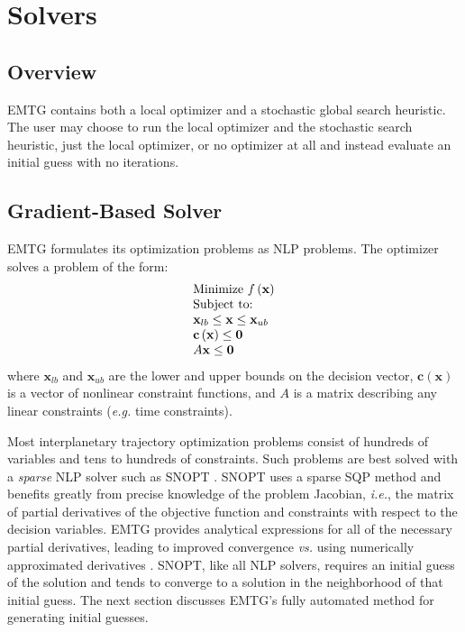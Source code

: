 \chapter{Solvers}
\label{chap:solvers}

\section{Overview}
\label{sec:solver-overview}

\ac{EMTG} contains both a local optimizer and a stochastic global search heuristic. The user may choose to run the local optimizer and the stochastic search heuristic, just the local optimizer, or no optimizer at all and instead evaluate an initial guess with no iterations.

\section{Gradient-Based Solver}
\label{sec:gradient-based-solver}

\ac{EMTG} formulates its optimization problems as \ac{NLP} problems. The optimizer solves a problem of the form:
%
\begin{equation}
\begin{array}{l}
{\text{Minimize }}f\left( {\bf{x}} \right) \\ 
{\text{Subject to:}} \\ 
{{\bf{x}}_{lb}} \le {\bf{x}} \le {{\bf{x}}_{ub}} \\ 
{\bf{c}}\left( {\bf{x}} \right) \le {\bf{0}} \\ 
A{\bf{x}} \le \bf{0} \\ 
\end{array}	
\label{eq:NLP}
\end{equation}
%
where $\mathbf{x}_{lb}$ and $\mathbf{x}_{ub}$ are the lower and upper bounds on the decision vector, $\mathbf{c}\left(\mathbf{x}\right)$ is a vector of nonlinear constraint functions, and $A$ is a matrix describing any linear constraints (\textit{e.g.} time constraints).

Most interplanetary trajectory optimization problems consist of hundreds of variables and tens to hundreds of constraints. Such problems are best solved with a \textit{sparse} \ac{NLP} solver such as \ac{SNOPT} \cite{GillSNOPT}. \ac{SNOPT} uses a sparse \ac{SQP} method and benefits greatly from precise knowledge of the problem Jacobian, \textit{i.e.}, the matrix of partial derivatives of the objective function and constraints with respect to the decision variables. \ac{EMTG} provides analytical expressions for all of the necessary partial derivatives, leading to improved convergence \textit{vs.} using numerically approximated derivatives \cite{BoundedImpulseDerivatives1,BoundedImpulseDerivatives2,EllisonPhD}. \ac{SNOPT}, like all \ac{NLP} solvers, requires an initial guess of the solution and tends to converge to a solution in the neighborhood of that initial guess. The next section discusses EMTG's fully automated method for generating initial guesses.

